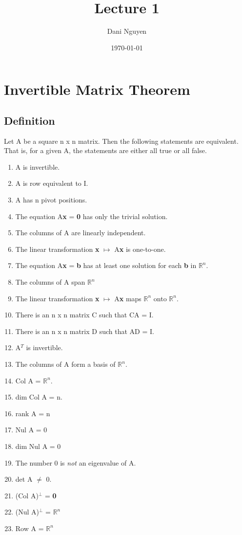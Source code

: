 \documentclass[12pt, letterpaper]{article}
\title{Lecture 1}
\author{Dani Nguyen}
\date{\today}
\begin{document}
\maketitle
\tableofcontents

\section{Invertible Matrix Theorem}
\subsection{Definition}
Let A be a square n x n matrix. Then the following statements are
equivalent. That is, for a given A, the statements are either all 
true or all false.
\begin{enumerate}
    \item A is invertible.
    \item A is row equivalent to I.
    \item A has n pivot positions.
    \item The equation A\textbf{x} = \textbf{0} has only the trivial solution.
    \item The columns of A are linearly independent.
    \item The linear transformation \textbf{x} $\mapsto$ A\textbf{x} is one-to-one.
    \item The equation A\textbf{x} = \textbf{b} has at least one solution for each \textbf{b} in $\mathbb{R}^n$.
    \item The columns of A span $\mathbb{R}^n$
    \item The linear transformation \textbf{x} $\mapsto$ A\textbf{x} maps $\mathbb{R}^n$ onto $\mathbb{R}^n$.
    \item There is an n x n matrix C such that CA = I.
    \item There is an n x n matrix D such that AD = I.
    \item A$^T$ is invertible.
    \item The columns of A form a basis of $\mathbb{R}^n$.
    \item Col A = $\mathbb{R}^n$.
    \item dim Col A = n.
    \item rank A = n
    \item Nul A = {0}
    \item dim Nul A = 0
    \item The number 0 is \emph{not} an eigenvalue of A.
    \item det A $\neq$ 0.
    \item (Col A)$^\bot$ = \textbf{0}
    \item (Nul A)$^\bot$ = $\mathbb{R}^n$
    \item Row A = $\mathbb{R}^n$
\end{enumerate}
\end{document}
